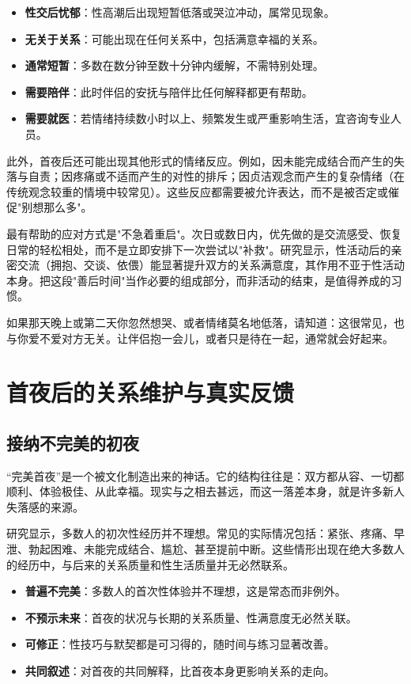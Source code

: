 \documentclass[12pt,UTF8]{ctexbook}
\newcommand{\keyword}[1]{\textbf{#1}}
\begin{document}
\begin{itemize}
	\item \keyword{性交后忧郁}：性高潮后出现短暂低落或哭泣冲动，属常见现象。
	\item \keyword{无关于关系}：可能出现在任何关系中，包括满意幸福的关系。
	\item \keyword{通常短暂}：多数在数分钟至数十分钟内缓解，不需特别处理。
	\item \keyword{需要陪伴}：此时伴侣的安抚与陪伴比任何解释都更有帮助。
	\item \keyword{需要就医}：若情绪持续数小时以上、频繁发生或严重影响生活，宜咨询专业人员。
\end{itemize}

此外，首夜后还可能出现其他形式的情绪反应。例如，因未能完成结合而产生的失落与自责；因疼痛或不适而产生的对性的排斥；因贞洁观念而产生的复杂情绪（在传统观念较重的情境中较常见）。这些反应都需要被允许表达，而不是被否定或催促"别想那么多"。

最有帮助的应对方式是"不急着重启"。次日或数日内，优先做的是交流感受、恢复日常的轻松相处，而不是立即安排下一次尝试以"补救"。研究显示，性活动后的亲密交流（拥抱、交谈、依偎）能显著提升双方的关系满意度，其作用不亚于性活动本身。把这段"善后时间"当作必要的组成部分，而非活动的结束，是值得养成的习惯。

\begin{tcolorbox}[colback=pink!5!white,colframe=red!50!black,title=贴心小叮咛]
	如果那天晚上或第二天你忽然想哭、或者情绪莫名地低落，请知道：这很常见，也与你爱不爱对方无关。让伴侣抱一会儿，或者只是待在一起，通常就会好起来。
\end{tcolorbox}

\section{首夜后的关系维护与真实反馈}
\subsection{接纳不完美的初夜}

“完美首夜”是一个被文化制造出来的神话。它的结构往往是：双方都从容、一切都顺利、体验极佳、从此幸福。现实与之相去甚远，而这一落差本身，就是许多新人失落感的来源。

研究显示，多数人的初次性经历并不理想。常见的实际情况包括：紧张、疼痛、早泄、勃起困难、未能完成结合、尴尬、甚至提前中断。这些情形出现在绝大多数人的经历中，与后来的关系质量和性生活质量并无必然联系。

\begin{itemize}
	\item \keyword{普遍不完美}：多数人的首次性体验并不理想，这是常态而非例外。
	\item \keyword{不预示未来}：首夜的状况与长期的关系质量、性满意度无必然关联。
	\item \keyword{可修正}：性技巧与默契都是可习得的，随时间与练习显著改善。
	\item \keyword{共同叙述}：对首夜的共同解释，比首夜本身更影响关系的走向。
\end{itemize}
\end{document}

